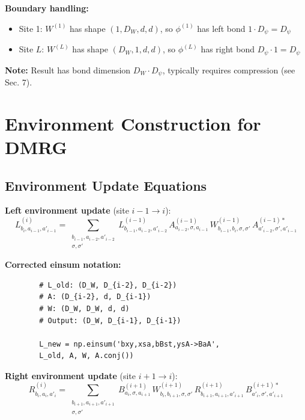 \documentclass[aps,prb,onecolumn,scriptaddress]{revtex4-2}
\begin{document}
	\textbf{Boundary handling:}
	\begin{itemize}
		\item Site 1: $W^{(1)}$ has shape $(1, D_W, d, d)$, so $\phi^{(1)}$ has left bond $1 \cdot D_\psi = D_\psi$
		\item Site $L$: $W^{(L)}$ has shape $(D_W, 1, d, d)$, so $\phi^{(L)}$ has right bond $D_\psi \cdot 1 = D_\psi$
	\end{itemize}
	
	\textbf{Note:} Result has bond dimension $D_W \cdot D_\psi$, typically requires compression (see Sec. 7).
	
	\section{Environment Construction for DMRG}
	
	\subsection{Environment Update Equations}
	
	\textbf{Left environment update} (site $i-1 \to i$):
	\begin{equation}
		L^{(i)}_{b_i, a_{i-1}, a'_{i-1}} = \sum_{\substack{b_{i-1}, a_{i-2}, a'_{i-2} \\ \sigma, \sigma'}} 
		L^{(i-1)}_{b_{i-1}, a_{i-2}, a'_{i-2}} \, 
		A^{(i-1)}_{a_{i-2}, \sigma, a_{i-1}} \,
		W^{(i-1)}_{b_{i-1}, b_i, \sigma, \sigma'} \,
		A^{(i-1)*}_{a'_{i-2}, \sigma', a'_{i-1}}
	\end{equation}
	
	\textbf{Corrected einsum notation:}
	\begin{verbatim}
		# L_old: (D_W, D_{i-2}, D_{i-2})
		# A: (D_{i-2}, d, D_{i-1})
		# W: (D_W, D_W, d, d)
		# Output: (D_W, D_{i-1}, D_{i-1})
		
		L_new = np.einsum('bxy,xsa,bBst,ysA->BaA', 
		L_old, A, W, A.conj())
	\end{verbatim}
	
	\textbf{Right environment update} (site $i+1 \to i$):
	\begin{equation}
		R^{(i)}_{b_i, a_i, a'_i} = \sum_{\substack{b_{i+1}, a_{i+1}, a'_{i+1} \\ \sigma, \sigma'}} 
		B^{(i+1)}_{a_i, \sigma, a_{i+1}} \,
		W^{(i+1)}_{b_i, b_{i+1}, \sigma, \sigma'} \,
		R^{(i+1)}_{b_{i+1}, a_{i+1}, a'_{i+1}} \,
		B^{(i+1)*}_{a'_i, \sigma', a'_{i+1}}
	\end{equation}
	
\end{document}
